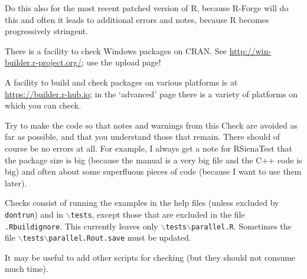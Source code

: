 \documentclass[12pt, a4paper]{article}
\renewcommand{\=}{\,=\,}
\newcommand{\+}{\,+\,}
\newcommand{\bs}{\backslash}
\newcommand{\RST}{{\sf RSienaTest }}
\begin{document}
  Do this also for the most recent patched version of R, because R-Forge will do this
  and often it leads to additional errors and notes, because R becomes progressively
  stringent.
  

There is a facility to check Windows packages on CRAN. See
\url{http://win-builder.r-project.org/}; use the upload page!

A facility to build and check packages on various platforms
is at \url{https://builder.r-hub.io}; in the `advanced' page
there is a variety of platforms on which you can check.

  Try to make the code so that notes and warnings from this Check are avoided as far as possible,
  and that you understand those that remain.
  There should of course be no errors at all.
  For example, I always get a note for \RST that the package size is big
  (because the manual is a very big file and the C++ code is big) and
  often about some superfluous pieces of code (because I want to use them later).

  Checks consist of running the examples in the help files (unless excluded by \texttt{dontrun})
  and in \texttt{$\bs$tests}, except those that are excluded in the file \texttt{.Rbuildignore}.
  This currently leaves only \texttt{$\bs$tests$\bs$parallel.R}.
  Sometimes the file \texttt{$\bs$tests$\bs$parallel.Rout.save} must be updated.

  It may be useful to add other scripts for checking (but they should not consume much time).
\end{document}
